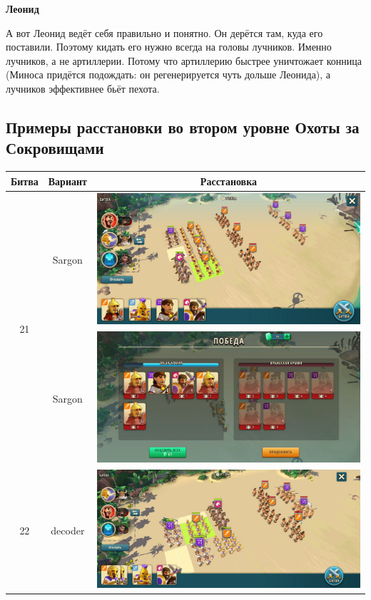 \textbf{Леонид}

А вот Леонид ведёт себя правильно и понятно.
Он дерётся там, куда его поставили.
Поэтому кидать его нужно всегда на головы лучников.
Именно лучников, а не артиллерии.
Потому что артиллерию быстрее уничтожает конница (Миноса придётся подождать: он регенерируется чуть дольше Леонида),
а лучников эффективнее бьёт пехота.

\subsection{Примеры расстановки во втором уровне Охоты за Сокровищами}

\noindent
\begin{longtable}{|c|c|c|}
    \hline
    Битва & Вариант & Расстановка \\\hline\endhead
    \multirow{2}{*}{21} & Sargon &
    \includegraphics[width=0.75\linewidth]{./parts/media/TreasureHunt/21/sargon/photo_2022-04-06_18-11-33.jpg} \\
    & Sargon &
    \includegraphics[width=0.75\linewidth]{./parts/media/TreasureHunt/21/sargon/photo_2022-04-06_18-11-59.jpg} \\
    \hline
    \multirow{4}{*}{22} & decoder &
    \includegraphics[width=0.75\linewidth]{./parts/media/TreasureHunt/22/decoder/photo_2022-04-06_18-08-54.jpg} \\

\end{longtable}
